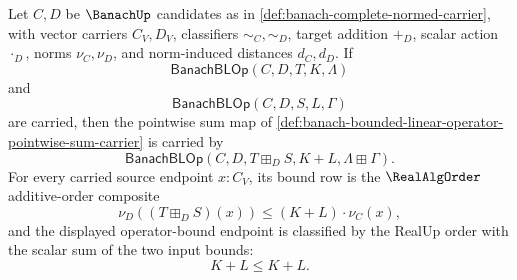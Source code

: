 \begin{theorem}
\label{thm:banach-bounded-linear-operator-pointwise-sum-closure}
Let $C,D$ be $\BanachUp$ candidates as in
\autoref{def:banach-complete-normed-carrier}, with vector carriers $C_V,D_V$,
classifiers $\sim_C,\sim_D$, target addition $+_D$, scalar action
$\cdot_D$, norms $\nu_C,\nu_D$, and norm-induced distances $d_C,d_D$. If
$$
\mathsf{BanachBLOp}(C,D,T,K,\Lambda)
$$
and
$$
\mathsf{BanachBLOp}(C,D,S,L,\Gamma)
$$
are carried, then the pointwise sum map of
\autoref{def:banach-bounded-linear-operator-pointwise-sum-carrier} is carried
by
$$
\mathsf{BanachBLOp}(C,D,T\boxplus_D S,K+L,\Lambda\boxplus\Gamma).
$$
For every carried source endpoint $x:C_V$, its bound row is the
$\RealAlgOrder$ additive-order composite
$$
\nu_D((T\boxplus_D S)(x))\le (K+L)\cdot\nu_C(x),
$$
and the displayed operator-bound endpoint is classified by the RealUp order
with the scalar sum of the two input bounds:
$$
K+L\le K+L.
$$
\end{theorem}
